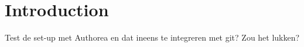 \section{Introduction}
Test de set-up met Authorea en dat ineens te integreren met git? Zou het lukken?